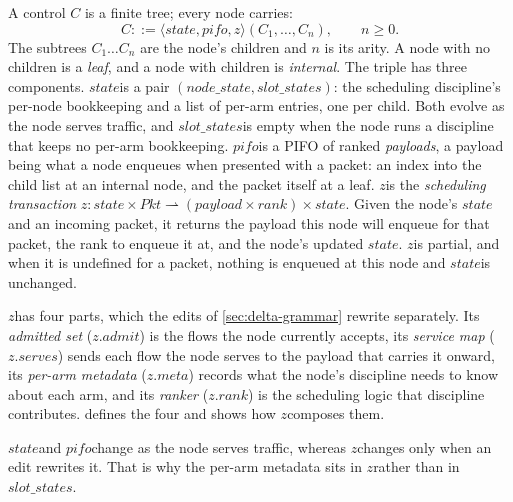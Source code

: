 \documentclass[sigplan,anonymous,review,nonacm]{acmart}
\newcommand{\notation}[1]{\ensuremath{#1}\ifmmode\else\xspace\fi}
\newcommand{\pifo}{\notation{\mathit{pifo}}}
\newcommand{\zz}{\notation{\mathit{z}}}
\newcommand{\stt}{\notation{\mathit{state}}}
\newcommand{\slotstates}{\notation{\mathit{slot\_states}}}
\begin{document}
A control \(C\) is a finite tree; every node carries:
\[
C \mathrel{::=} \langle \mathit{state}, \mathit{pifo}, \mathit{z} \rangle(C_1, \ldots, C_n), \qquad n \geq 0.
\]
The subtrees \(C_1 \ldots C_n\) are the node's children and \(n\) is its arity.
A node with no children is a \emph{leaf}, and a node with children is \emph{internal}.
The triple has three components.
\stt is a pair \((\mathit{node\_state}, \mathit{slot\_states})\): the scheduling discipline's per-node bookkeeping and a list of per-arm entries, one per child.
Both evolve as the node serves traffic, and \slotstates is empty when the node runs a discipline that keeps no per-arm bookkeeping.
\pifo is a PIFO of ranked \emph{payloads}, a payload being what a node enqueues when presented with a packet: an index into the child list at an internal node, and the packet itself at a leaf.
\zz is the \emph{scheduling transaction} \(\mathit{z} : \mathit{state} \times \mathit{Pkt} \rightharpoonup (\mathit{payload} \times \mathit{rank}) \times \mathit{state}\).
Given the node's \stt and an incoming packet, it returns the payload this node will enqueue for that packet, the rank to enqueue it at, and the node's updated \stt.
\zz is partial, and when it is undefined for a packet, nothing is enqueued at this node and \stt is unchanged.

\zz has four parts, which the edits of \cref{sec:delta-grammar} rewrite separately.
Its \emph{admitted set} (\(\mathit{z}.\mathit{admit}\)) is the flows the node currently accepts, its \emph{service map} (\(\mathit{z}.\mathit{serves}\)) sends each flow the node serves to the payload that carries it onward, its \emph{per-arm metadata} (\(\mathit{z}.\mathit{meta}\)) records what the node's discipline needs to know about each arm, and its \emph{ranker} (\(\mathit{z}.\mathit{rank}\)) is the scheduling logic that discipline contributes.
 defines the four and shows how \zz composes them.


\stt and \pifo change as the node serves traffic, whereas \zz changes only when an edit rewrites it.
That is why the per-arm metadata sits in \zz rather than in \slotstates.
\end{document}
